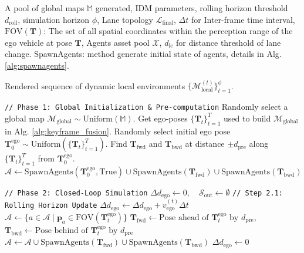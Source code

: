 \begin{algorithm}[htb]
\caption{A* routing + 2D-IDM based control engine pseudo codes}
\label{alg:idm_rollout}
\begin{algorithmic}[1]

\Require A pool of global maps $\mathbb{M}$ generated, IDM parameters, rolling horizon threshold $d_{\text{roll}}$, simulation horizon $\phi$, Lane topology $\mathcal{L}_{\text{final}}$, $\Delta t$ for Inter-frame time interval, $\text{FOV}(\mathbf{T})$: The set of all spatial coordinates within the perception range of the ego vehicle at pose $\mathbf{T}$, Agents asset pool $\mathcal{X}$, $d_{\text{lc}}$ for distance threshold of lane change. SpawnAgents: method generate initial state of agents, details in Alg. \ref{alg:spawnagents}. 


\Ensure Rendered sequence of dynamic local environments $\{\mathcal{M}_{\text{local}}^{(t)}\}_{t=1}^{\phi}$.


\State \texttt{// Phase 1: Global Initialization \& Pre-computation}
\State Randomly select a global map $\mathcal{M}_{\text{global}} \sim \text{Uniform}(\mathbb{M})$.
\State Get ego-poses $\{\mathbf{T}_t\}_{t=1}^T$ used to build $\mathcal{M}_{\text{global}}$ in Alg. \ref{alg:keyframe_fusion}.
\State Randomly select initial ego pose $\mathbf{T}_0^{\text{ego}} \sim \text{Uniform}(\{\mathbf{T}_t\}_{t=1}^T)$.
\State Find $\mathbf{T}_{\text{fwd}}$ and $\mathbf{T}_{\text{bwd}}$ at distance $\pm d_{\text{pre}}$ along $\{\mathbf{T}_t\}_{t=1}^T$ from $\mathbf{T}_0^{\text{ego}}$.
\State $\mathcal{A} \gets \text{SpawnAgents}(\mathbf{T}_0^{\text{ego}}, \text{True}) \cup \text{SpawnAgents}(\mathbf{T}_{\text{fwd}}) \cup \text{SpawnAgents}(\mathbf{T}_{\text{bwd}})$


\State \texttt{// Phase 2: Closed-Loop Simulation}
\State $\Delta d_{\text{ego}} \gets 0, \quad \mathcal{S}_{\text{out}} \gets \emptyset$ 
    \State \texttt{// Step 2.1: Rolling Horizon Update}
    \State $\Delta d_{\text{ego}} \gets \Delta d_{\text{ego}} + v_{\text{ego}}^{(t)} \Delta t$
        \State $\mathcal{A} \gets \{a \in \mathcal{A} \mid \mathbf{p}_a \in \text{FOV}(\mathbf{T}_t^{\text{ego}})\}$ 
        \State $\mathbf{T}_{\text{fwd}} \gets \text{Pose ahead of } \mathbf{T}_t^{\text{ego}} \text{ by } d_{\text{pre}}$, $\mathbf{T}_{\text{bwd}} \gets \text{Pose behind of } \mathbf{T}_t^{\text{ego}} \text{ by } d_{\text{pre}}$
        \State $\mathcal{A} \gets \mathcal{A} \cup \text{SpawnAgents}(\mathbf{T}_{\text{fwd}}) \cup \text{SpawnAgents}(\mathbf{T}_{\text{bwd}})$ 
        \State $\Delta d_{\text{ego}} \gets 0$
    \EndIf


\end{algorithmic}
\end{algorithm}
